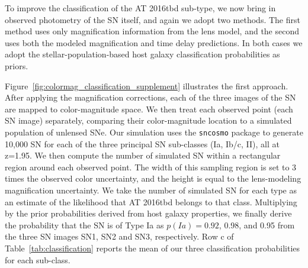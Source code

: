 \documentclass[12pt]{article}
\def\SNABC{AT 2016tbd\xspace}
\begin{document}
To improve the classification of the \SNABC sub-type, we now bring in observed photometry of the SN itself, and again we adopt two methods.  The first method uses only magnification information from the lens model, and the second uses both the modeled magnification and time delay predictions.  In both cases we adopt the stellar-population-based host galaxy classification probabilities as priors.

Figure~\ref{fig:colormag_classification_supplement} illustrates the first approach.  After applying the magnification corrections, each of the three images of the SN are mapped to color-magnitude space.  We then treat each observed point (each SN image) separately, comparing their color-magnitude location to a simulated population of unlensed SNe.  Our simulation uses the {\tt sncosmo} package \cite{barbary_sncosmo_2016}  to generate 10,000 SN for each of the three principal SN sub-classes (Ia, Ib/c, II), all at z=1.95.  
We then compute the number of simulated SN within a rectangular region around each observed point. The width of this sampling region is set to 3 times the observed color uncertainty, and the height is equal to the lens-modeling magnification uncertainty.  We take the number of simulated SN for each type as an estimate of the likelihood that \SNABC belongs to that class.   Multiplying by the prior probabilities derived from host galaxy properties, we finally derive the probability that the SN is of Type Ia as $p(Ia)=0.92$, 0.98, and 0.95 from the three SN images SN1, SN2 and SN3, respectively. Row c of Table~\ref{tab:classification} reports the mean of our three classification probabilities for each sub-class. 
\end{document}
